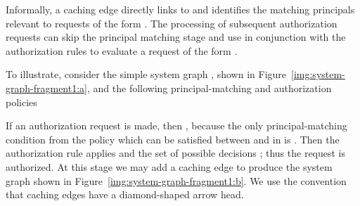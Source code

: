 \documentclass{article}
\begin{document}
Informally, a caching edge  directly links  to  and identifies the matching principals  relevant to requests of the form .
The processing of subsequent authorization requests can skip the principal matching stage and use  in conjunction with the authorization rules to evaluate a request of the form .

To illustrate, consider the simple system graph , shown in Figure~\ref{img:system-graph-fragment1:a}, and the following principal-matching and authorization policies


If an authorization request  is made, then \mbox{}, because the only principal-matching condition from the policy which can be satisfied between  and  in  is .
Then the authorization rule  applies and the set of possible decisions ; thus the request is authorized.
At this stage we may add a caching edge  to produce the system graph shown in Figure~\ref{img:system-graph-fragment1:b}.
We use the convention that caching edges have a diamond-shaped arrow head.
\end{document}
